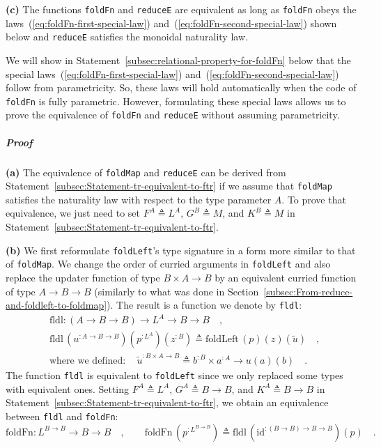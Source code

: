 \textbf{(c)} The functions \lstinline!foldFn! and \lstinline!reduceE!
are equivalent as long as \lstinline!foldFn! obeys the laws~(\ref{eq:foldFn-first-special-law})
and~(\ref{eq:foldFn-second-special-law}) shown below and \lstinline!reduceE!
satisfies the monoidal naturality law. 

We will show in Statement~\ref{subsec:relational-property-for-foldFn}
below that the special laws~(\ref{eq:foldFn-first-special-law})
and~(\ref{eq:foldFn-second-special-law}) follow from parametricity.
So, these laws will hold automatically when the code of \lstinline!foldFn!
is fully parametric. However, formulating these special laws allows
us to prove the equivalence of \lstinline!foldFn! and \lstinline!reduceE!
without assuming parametricity.

\subparagraph{Proof}

\textbf{(a)} The equivalence of \lstinline!foldMap! and \lstinline!reduceE!
can be derived from Statement~\ref{subsec:Statement-tr-equivalent-to-ftr}
if we assume that \lstinline!foldMap! satisfies the naturality law
with respect to the type parameter $A$. To prove that equivalence,
we just need to set $F^{A}\triangleq L^{A}$, $G^{B}\triangleq M$,
and $K^{B}\triangleq M$ in Statement~\ref{subsec:Statement-tr-equivalent-to-ftr}.

\textbf{(b)} We first reformulate \lstinline!foldLeft!\textsf{'}s type signature
in a form more similar to that of \lstinline!foldMap!. We change
the order of curried arguments in \lstinline!foldLeft! and also replace
the updater function of type $B\times A\rightarrow B$ by an equivalent
curried function of type $A\rightarrow B\rightarrow B$ (similarly
to what was done in Section~\ref{subsec:From-reduce-and-foldleft-to-foldmap}).
The result is a function we denote by \lstinline!fldl!:
\begin{align*}
 & \text{fldl}:(A\rightarrow B\rightarrow B)\rightarrow L^{A}\rightarrow B\rightarrow B\quad,\\
 & \text{fldl}\,(u^{:A\rightarrow B\rightarrow B})(p^{:L^{A}})(z^{:B})\triangleq\text{foldLeft}\,(p)(z)(\tilde{u})\quad,\\
 & \text{where we defined}:\quad\tilde{u}^{:B\times A\rightarrow B}\triangleq b^{:B}\times a^{:A}\rightarrow u\left(a\right)(b)\quad.
\end{align*}
The function \lstinline!fldl! is equivalent to \lstinline!foldLeft!
since we only replaced some types with equivalent ones. Setting $F^{A}\triangleq L^{A}$,
$G^{A}\triangleq B\rightarrow B$, and $K^{A}\triangleq B\rightarrow B$
in Statement~\ref{subsec:Statement-tr-equivalent-to-ftr}, we obtain
an equivalence between \lstinline!fldl! and \lstinline!foldFn!:
\[
\text{foldFn}:L^{B\rightarrow B}\rightarrow B\rightarrow B\quad,\quad\quad\text{foldFn}\,(p^{:L^{B\rightarrow B}})\triangleq\text{fldl}\,(\text{id}^{:(B\rightarrow B)\rightarrow B\rightarrow B})(p)\quad.
\]

